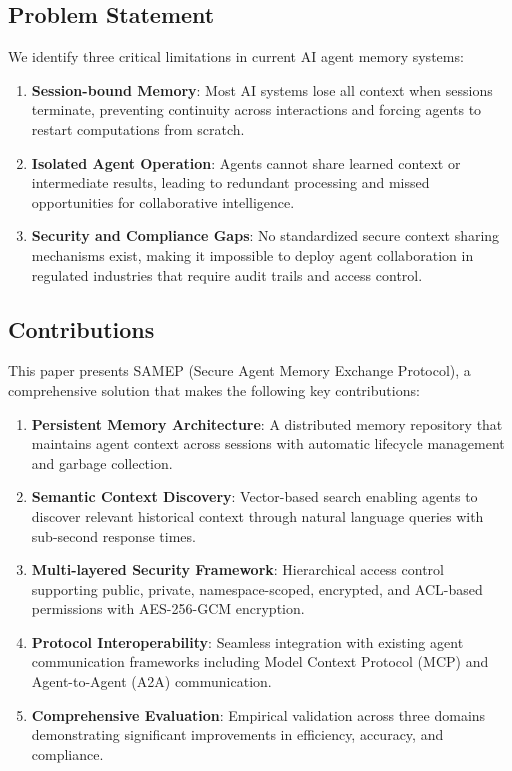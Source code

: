 \documentclass[11pt]{article}
\begin{document}
\subsection{Problem Statement}

We identify three critical limitations in current AI agent memory systems:

\begin{enumerate}
    \item \textbf{Session-bound Memory}: Most AI systems lose all context when sessions terminate, preventing continuity across interactions and forcing agents to restart computations from scratch.
    
    \item \textbf{Isolated Agent Operation}: Agents cannot share learned context or intermediate results, leading to redundant processing and missed opportunities for collaborative intelligence.
    
    \item \textbf{Security and Compliance Gaps}: No standardized secure context sharing mechanisms exist, making it impossible to deploy agent collaboration in regulated industries that require audit trails and access control.
\end{enumerate}

\subsection{Contributions}

This paper presents SAMEP (Secure Agent Memory Exchange Protocol), a comprehensive solution that makes the following key contributions:

\begin{enumerate}
    \item \textbf{Persistent Memory Architecture}: A distributed memory repository that maintains agent context across sessions with automatic lifecycle management and garbage collection.
    
    \item \textbf{Semantic Context Discovery}: Vector-based search enabling agents to discover relevant historical context through natural language queries with sub-second response times.
    
    \item \textbf{Multi-layered Security Framework}: Hierarchical access control supporting public, private, namespace-scoped, encrypted, and ACL-based permissions with AES-256-GCM encryption.
    
    \item \textbf{Protocol Interoperability}: Seamless integration with existing agent communication frameworks including Model Context Protocol (MCP) and Agent-to-Agent (A2A) communication.
    
    \item \textbf{Comprehensive Evaluation}: Empirical validation across three domains demonstrating significant improvements in efficiency, accuracy, and compliance.
\end{enumerate}
\end{document}
